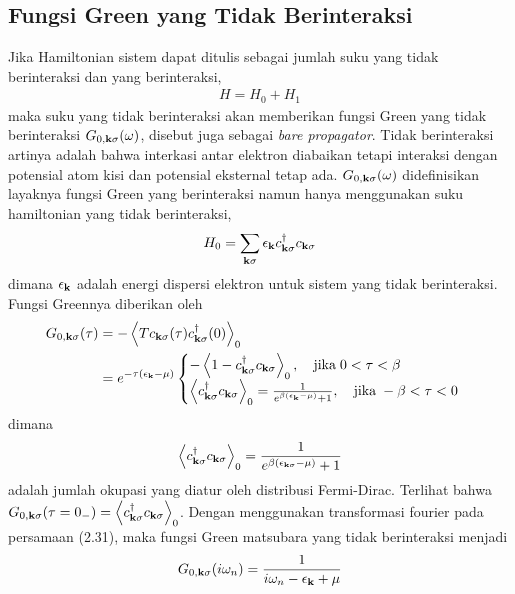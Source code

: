 \subsection{Fungsi Green yang Tidak Berinteraksi}
Jika Hamiltonian sistem dapat ditulis sebagai jumlah suku yang tidak berinteraksi dan yang berinteraksi,
\begin{align}
H = H_0 + H_1
\end{align}
maka suku yang tidak berinteraksi akan memberikan fungsi Green yang tidak berinteraksi $G_{0,\textbf{k}\sigma}(\omega)$, disebut juga sebagai \textit{bare propagator}. Tidak berinteraksi artinya adalah bahwa interkasi antar elektron diabaikan tetapi interaksi dengan potensial atom kisi dan potensial eksternal tetap ada. $G_{0,\textbf{k}\sigma}(\omega)$ didefinisikan layaknya fungsi Green yang berinteraksi namun hanya menggunakan suku hamiltonian yang tidak berinteraksi,
\begin{align}
H_0 = \sum_{\textbf{k}\sigma} \epsilon_{\textbf{k}} c^\dagger_{\textbf{k}\sigma} c_{\textbf{k}\sigma}
\end{align}
dimana $\epsilon_{\textbf{k}}$ adalah energi dispersi elektron untuk sistem yang tidak berinteraksi. Fungsi Greennya diberikan oleh
\begin{align}
G_{0,\textbf{k}\sigma}(\tau) &= - \left\langle T c_{\textbf{k}\sigma}(\tau)c^\dagger_{\textbf{k}\sigma}(0)\right\rangle_0 \notag\\
&= e^{-\tau(\epsilon_{\textbf{k}} - \mu)}
\begin{cases}
-\left\langle 1 - c^\dagger_{\textbf{k}\sigma}c_{\textbf{k}\sigma} \right\rangle_0, \quad \text{jika} \; 0 < \tau < \beta\\
\left\langle c^\dagger_{\textbf{k}\sigma}c_{\textbf{k}\sigma} \right\rangle_0 = \frac{1}{e^{\beta(\epsilon_{\textbf{k}} - \mu)} + 1}, \quad \text{jika} \; -\beta < \tau < 0
\end{cases}
\end{align}
dimana 
\begin{align}
\left\langle c^\dagger_{\textbf{k}\sigma}c_{\textbf{k}\sigma} \right\rangle_0 = \frac{1}{e^{\beta(\epsilon_{\textbf{k}\sigma} - \mu)} + 1}
\end{align}
adalah jumlah okupasi yang diatur oleh distribusi Fermi-Dirac. Terlihat bahwa $G_{0,\textbf{k}\sigma}(\tau = 0_-) = \left\langle c^\dagger_{\textbf{k}\sigma} c_{\textbf{k}\sigma} \right\rangle_0$. Dengan menggunakan transformasi fourier pada persamaan (2.31), maka fungsi Green matsubara yang tidak berinteraksi menjadi 
\begin{align}
G_{0,\textbf{k}\sigma}(i\omega_n) = \frac{1}{i\omega_n - \epsilon_{\textbf{k}} + \mu}
\end{align}
